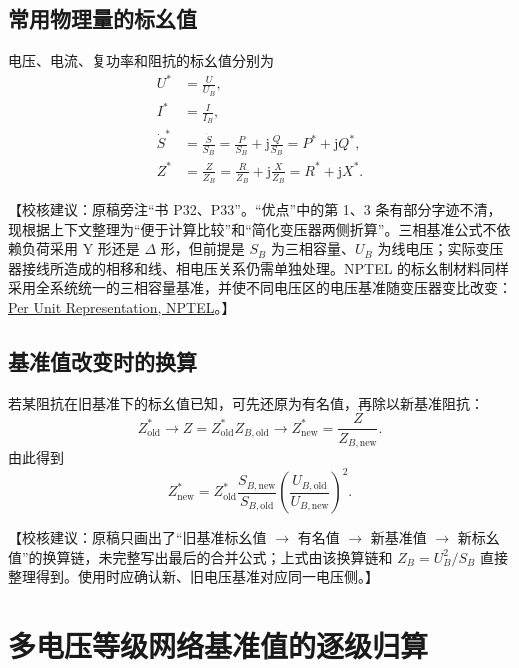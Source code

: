 \documentclass[
  12pt,
  UTF8,
  a4paper,
  fontset=fandol,
  oneside,
  openany
]{ctexrep}
\newcommand{\reviewnote}[1]{%
  \par\smallskip
  {\color{reviewgray}\small\noindent【校核建议：#1】\par}
  \smallskip
}
\begin{document}
\subsection{常用物理量的标幺值}

电压、电流、复功率和阻抗的标幺值分别为
\begin{align}
  U^* & =\frac{U}{U_B}, \\
  I^* & =\frac{I}{I_B}, \\
  \dot S^* & =\frac{\dot S}{S_B}
  =\frac{P}{S_B}+\mathrm{j}\frac{Q}{S_B}
  =P^*+\mathrm{j}Q^*, \\
  Z^* & =\frac{Z}{Z_B}
  =\frac{R}{Z_B}+\mathrm{j}\frac{X}{Z_B}
  =R^*+\mathrm{j}X^*.
\end{align}

\reviewnote{原稿旁注“书 P32、P33”。“优点”中的第 1、3 条有部分字迹不清，现根据上下文整理为“便于计算比较”和“简化变压器两侧折算”。三相基准公式不依赖负荷采用 Y 形还是 $\Delta$ 形，但前提是 $S_B$ 为三相容量、$U_B$ 为线电压；实际变压器接线所造成的相移和线、相电压关系仍需单独处理。NPTEL 的标幺制材料同样采用全系统统一的三相容量基准，并使不同电压区的电压基准随变压器变比改变：\href{https://archive.nptel.ac.in/content/storage2/courses/108104051/chapter_1/1_20.html}{Per Unit Representation, NPTEL}。}

\subsection{基准值改变时的换算}

若某阻抗在旧基准下的标幺值已知，可先还原为有名值，再除以新基准阻抗：
\begin{equation}
  Z_{\mathrm{old}}^*
  \longrightarrow
  Z=Z_{\mathrm{old}}^*Z_{B,\mathrm{old}}
  \longrightarrow
  Z_{\mathrm{new}}^*=\frac{Z}{Z_{B,\mathrm{new}}}.
\end{equation}
由此得到
\begin{equation}
  Z_{\mathrm{new}}^*
  =Z_{\mathrm{old}}^*
  \frac{S_{B,\mathrm{new}}}{S_{B,\mathrm{old}}}
  \left(\frac{U_{B,\mathrm{old}}}{U_{B,\mathrm{new}}}\right)^2.
\end{equation}

\reviewnote{原稿只画出了“旧基准标幺值 $\rightarrow$ 有名值 $\rightarrow$ 新基准值 $\rightarrow$ 新标幺值”的换算链，未完整写出最后的合并公式；上式由该换算链和 $Z_B=U_B^2/S_B$ 直接整理得到。使用时应确认新、旧电压基准对应同一电压侧。}

\section{多电压等级网络基准值的逐级归算}
\end{document}
